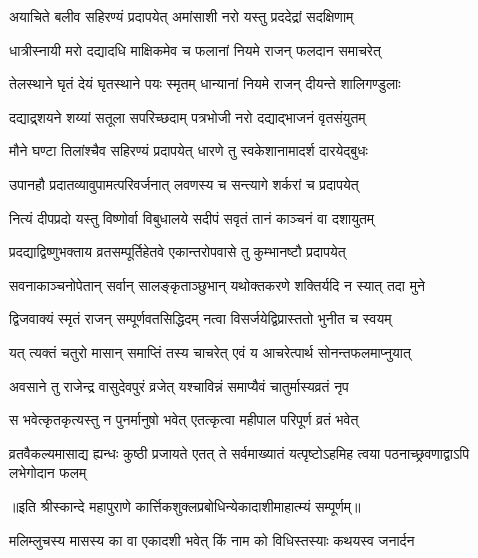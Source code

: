 \twolineshloka
{अयाचिते बलीव सहिरण्यं प्रदापयेत्}
{अमांसाशी नरो यस्तु प्रददेद्रां सदक्षिणाम्} %

\twolineshloka
{धात्रीस्नायी मरो दद्यादधि माक्षिकमेव च}
{फलानां नियमे राजन् फलदान समाचरेत्} %

\twolineshloka
{तेलस्थाने घृतं देयं घृतस्थाने पयः स्मृतम्}
{धान्यानां नियमे राजन् दीयन्ते शालिगण्डुलाः} %

\twolineshloka
{दद्याद्र्शयने शय्यां सतूला सपरिच्छदाम्}
{पत्रभोजी नरो दद्याद्भाजनं वृतसंयुतम्} %

\twolineshloka
{मौने घण्टा तिलांश्चैव सहिरण्यं प्रदापयेत्}
{धारणे तु स्वकेशानामादर्श दारयेद्बुधः} %

\twolineshloka
{उपानहौ प्रदातव्यावुपामत्परिवर्जनात्}
{लवणस्य च सन्त्यागे शर्करां च प्रदापयेत्} %

\twolineshloka
{नित्यं दीपप्रदो यस्तु विष्णोर्वा विबुधालये}
{सदीपं सवृतं तानं काञ्चनं वा दशायुतम्} %

\twolineshloka
{प्रदद्याद्विष्णुभक्ताय व्रतसम्पूर्तिहेतवे}
{एकान्तरोपवासे तु कुम्भानष्टौ प्रदापयेत्} %

\twolineshloka
{सवनाकाञ्चनोपेतान् सर्वान् सालङ्कृताञ्छुभान्}
{यथोक्तकरणे शक्तिर्यदि न स्यात् तदा मुने} %

\twolineshloka
{द्विजवाक्यं स्मृतं राजन् सम्पूर्णवतसिद्धिदम्}
{नत्वा विसर्जयेद्विप्रास्ततो भुनीत च स्वयम्} %

\twolineshloka
{यत् त्यक्तं चतुरो मासान् समाप्तिं तस्य चाचरेत्}
{एवं य आचरेत्पार्थ सोनन्तफलमाप्नुयात्} %

\twolineshloka
{अवसाने तु राजेन्द्र वासुदेवपुरं व्रजेत्}
{यश्चाविन्नं समाप्यैवं चातुर्मास्यव्रतं नृप} %

\twolineshloka
{स भवेत्कृतकृत्यस्तु न पुनर्मानुषो भवेत्}
{एतत्कृत्वा महीपाल परिपूर्ण व्रतं भवेत्} %

\threelineshloka
{व्रतवैकल्यमासाद्य ह्यन्धः कुष्ठी प्रजायते}
{एतत् ते सर्वमाख्यातं यत्पृष्टोऽहमिह त्वया}
{पठनाच्छ्रवणाद्वाऽपि लभेगोदान फलम्} %

॥इति श्रीस्कान्दे महापुराणे कार्त्तिकशुक्लप्रबोधिन्येकादाशीमाहात्म्यं सम्पूर्णम्॥


\hyperref[sec:ekadashi_mahatmyam_vrata_raja]{\closesub}
\clearpage

\label{sec:vrata-raja-purushottama-shukla-kamala}


\twolineshloka
{मलिम्लुचस्य मासस्य का वा एकादशी भवेत्}
{किं नाम को विधिस्तस्याः कथयस्व जनार्दन} %

